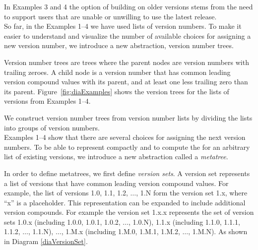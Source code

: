 \documentclass[conference]{IEEEtran}
\begin{document}
In Examples 3 and 4 the option of building on older versions stems from the need to support users that are unable or unwilling to use the latest release.\\

So far, in the Examples 1--4 we have used lists of version numbers. To make it easier to understand and visualize the number of available choices for assigning a new version number, we introduce a new abstraction, version number trees.

Version number trees are trees where the parent nodes are version numbers with trailing zeroes. A child node is a version number that has common leading version compound values with its parent, and at least one less trailing zero than its parent.
Figure~\ref{fig:diaExamples} shows the version trees for the lists of versions from Examples 1--4.

We construct version number trees from version number lists by dividing the lists into groups of version numbers. 
 \\

Examples 1--4 show that there are several choices for assigning the next version numbers. To be able to represent compactly and to compute the \choices for an arbitrary list of existing versions, we introduce a new abstraction called a \emph{metatree}. 


In order to define metatrees, we first define \emph{version sets}.
A version set represents a list of versions that have common leading version compound values. For example, the list of versions 1.0, 1.1, 1.2, $\dots$, 1.N 
form the version set 1.x, where ``x'' is a placeholder.
This representation can be expanded to include additional version compounds. 
For example the version set 1.x.x represents the set of version sets 1.0.x (including 1.0.0, 1.0.1, 1.0.2, $\dots$, 1.0.N), 1.1.x (including 1.1.0, 1.1.1, 1.1.2, $\dots$, 1.1.N),  $\dots$, 1.M.x (including 1.M.0, 1.M.1, 1.M.2, $\dots$, 1.M.N). As shown in Diagram \ref{diaVersionSet}.
\end{document}
